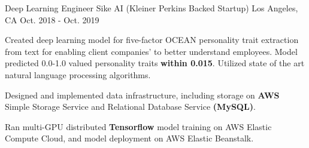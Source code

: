\cventry
    {Deep Learning Engineer} %
    {Sike AI (Kleiner Perkins Backed Startup)} %
    {Los Angeles, CA} %
    {Oct. 2018 - Oct. 2019} %
    {
      \begin{cvitems} %
        \item {Created deep learning model for five-factor OCEAN personality trait extraction from text for enabling 
        client companies' to better understand employees. Model predicted 0.0-1.0 valued personality traits \textbf{within 0.015}.
        Utilized state of the art natural language processing algorithms.}
        \item {Designed and implemented data infrastructure, including storage on \textbf{AWS} Simple Storage Service
         and Relational Database Service \textbf{(MySQL)}.
        \item Ran multi-GPU distributed \textbf{Tensorflow} model training on AWS Elastic Compute Cloud, and model deployment on AWS Elastic Beanstalk.}
      \end{cvitems}
    }